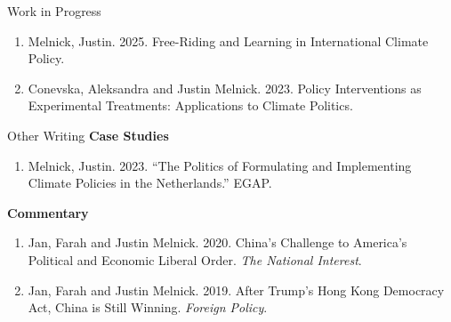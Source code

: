 \documentclass{resume} %
\begin{document}
\begin{rSection}{Work in Progress}

\begin{enumerate}
\item Melnick, Justin. 2025. Free-Riding and Learning in International Climate Policy.
    \item Conevska, Aleksandra and Justin Melnick. 2023. Policy Interventions as Experimental Treatments: Applications to Climate Politics.
\end{enumerate}

\end{rSection}

\begin{rSection}{Other Writing}
\textbf{Case Studies}
\begin{enumerate}
\item Melnick, Justin. 2023. ``The Politics of Formulating and Implementing Climate Policies in the Netherlands.'' EGAP.
\end{enumerate}

\textbf{Commentary}
    \begin{enumerate}
    \item   Jan, Farah and Justin Melnick. 2020. China's Challenge to America's Political and Economic Liberal Order. \textit{The National Interest}.
    \item    Jan, Farah and Justin Melnick. 2019. After Trump's Hong Kong Democracy Act, China is Still Winning. \textit{Foreign Policy}.
\end{enumerate}
\end{rSection}

\newpage
\end{document}
